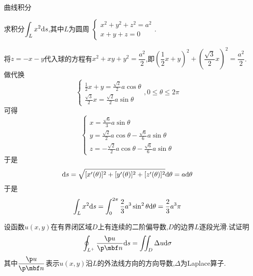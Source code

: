 \documentclass{ctexart}
\begin{document}
\pagestyle{empty}
\begin{center}\large 曲线积分\end{center}
\begin{problem}[A.1]
    求积分$\displaystyle\int_{L}x^2\mathrm{d} s$,其中$L$为圆周
    $\left\{\begin{array}{l}
        x^2+y^2+z^2=a^2\\x+y+z=0
    \end{array}\right.$.
\end{problem}
\begin{solution}
    将$z=-x-y$代入球的方程有$x^2+xy+y^2=\dfrac{a^2}{2}$,即$\left(\dfrac{1}{2}x+y\right)^2+\left(\dfrac{\sqrt3}{2}x\right)^2=\dfrac{a^2}{2}$.做代换
    \[\left\{\begin{array}{l}
        \frac{1}{2}x+y=\frac{\sqrt2}{2}a\cos\theta \\
        \frac{\sqrt{3}}{2}x=\frac{\sqrt2}{2}a\sin\theta
    \end{array}\right.,0\leqslant\theta\leqslant2\pi\]
    可得
    \[\left\{\begin{array}{l}
        x=\frac{\sqrt6}{3}a\sin\theta \\
        y=\frac{\sqrt2}{2}a\cos\theta-\frac{\sqrt6}{6}a\sin\theta \\
        z=-\frac{\sqrt2}{2}a\cos\theta-\frac{\sqrt6}{6}a\sin\theta
    \end{array}\right.\]
    于是
    \[\mathrm{d} s=\sqrt{[x'(\theta)]^2+[y'(\theta)]^2+[z'(\theta)]^2}\mathrm{d}\theta=a\mathrm{d}\theta\]
    于是
    \[\int_Lx^2\mathrm{d} s=\int_0^{2\pi}\dfrac{2}{3}a^3\sin^2\theta\mathrm{d}\theta=\dfrac{2}{3}a^3\pi\]
\end{solution}
\begin{problem}[C.1]
    设函数$u(x,y)$在有界闭区域$D$上有连续的二阶偏导数,$D$的边界$L$逐段光滑.试证明
    \[\oint_{L^+}\dfrac{\p u}{\p\mbf n}\di s=\iint_D\Delta u\di\sigma\]
    其中$\dfrac{\p u}{\p\mbf n}$表示$u(x,y)$沿$L$的外法线方向的方向导数,$\Delta$为Laplace算子.
\end{problem}
\end{document}
